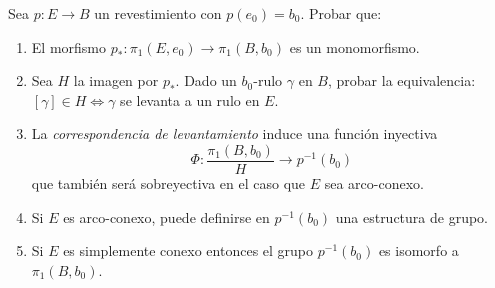 \documentclass{article}
\theoremstyle{plain}
\theoremstyle{definition}
\newenvironment{ejercicio}[1]{\begin{trivlist}
\item[\hskip \labelsep {\bfseries Ejercicio}\hskip \labelsep {\bfseries #1.}]}{\end{trivlist}}
\begin{document}
\vspace{.5cm}

\begin{ejercicio}{6}
    Sea \( p:E\rightarrow B \) un revestimiento con \( p(e_{0})=b_{0} \). Probar que:
    \begin{enumerate}
        \item El morfismo \( p_{*}:\pi_{1}(E,e_{0})\longrightarrow\pi_{1}(B,b_{0}) \) es un monomorfismo.
        \item Sea \( H \) la imagen por \( p_{*} \). Dado un \( b_{0} \)-rulo \( \gamma \) en \( B \), probar la equivalencia: \( [\gamma]\in H \iff \gamma \) se levanta a un rulo en \( E \).
        \item La \textit{correspondencia de levantamiento} induce una función inyectiva \[ \Phi:\frac{\pi_{1}(B,b_{0})}{H}\longrightarrow p^{-1}(b_{0}) \] que también será sobreyectiva en el caso que \( E \) sea arco-conexo.
        \item Si \( E \) es arco-conexo, puede definirse en \( p^{-1}(b_{0}) \) una estructura de grupo.
        \item Si \( E \) es simplemente conexo entonces el grupo \( p^{-1}(b_{0}) \) es isomorfo a \( \pi_{1}(B,b_{0}) \).
    \end{enumerate}
\end{ejercicio}
\end{document}
